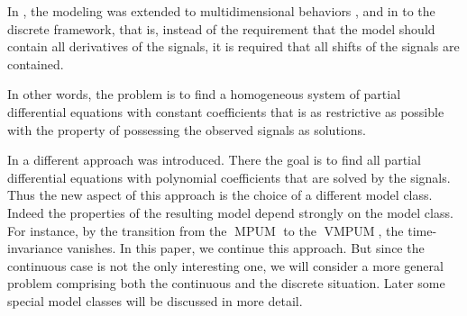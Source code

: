 \documentclass[a4paper,10pt]{article}
\theoremstyle{nonumberplain}
\DeclareMathOperator{\MPUM}{MPUM}
\DeclareMathOperator{\VMPUM}{VMPUM}
\begin{document}
In \cite{Eva1}, the modeling was extended to multidimensional behaviors 
\cite{CQR,PQ},  
and in \cite{Eva2} to the discrete framework, that is, instead of the 
requirement that the model should contain all derivatives of the signals, 
it is required that all shifts of the signals are contained.

In other words, the problem is to find a homogeneous system of partial differential 
equations with constant coefficients that is as restrictive as possible with the property 
of possessing the observed signals as solutions.

In \cite{VMPUM} a different approach was introduced.
There the goal is to find all partial differential equations with 
polynomial coefficients that are solved by the signals. 
Thus the new aspect of this approach is the choice of a different model class.
Indeed the properties of the resulting model depend strongly 
on the model class. For instance, by the 
transition from the $\MPUM$ to the $\VMPUM$, the time-invariance vanishes.
In this paper, we continue this approach. But since the continuous case is 
not the only interesting one, we will consider 
a more general problem comprising 
both the continuous and the discrete situation.
Later some special model classes will be discussed in more detail.
\end{document}
